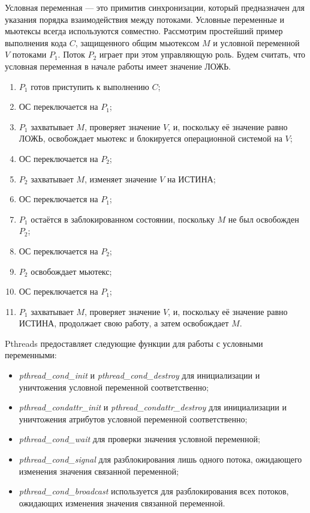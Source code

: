 Условная переменная --- это примитив синхронизации,
который предназначен для указания порядка взаимодействия между потоками.
Условные переменные и мьютексы всегда используются совместно.
Рассмотрим простейший пример выполнения кода \( C \),
защищенного общим мьютексом \( M \) и условной переменной \( V \)
потоками \( P_1 \). Поток \( P_2 \) играет при этом управляющую роль.
Будем считать, что условная переменная в начале работы имеет значение ЛОЖЬ.
\begin{enumerate}
\item \( P_1 \) готов приступить к выполнению \( C \);
\item ОС переключается на \( P_1 \);
\item \( P_1 \) захватывает \( M \), проверяет значение \( V \), и,
  поскольку её значение равно ЛОЖЬ, освобождает мьютекс и блокируется операционной системой
  на \( V \);
\item ОС переключается на \( P_2 \);
\item \( P_2 \) захватывает \( M \), изменяет значение \( V \) на ИСТИНА;
\item ОС переключается на \( P_1 \);
\item \( P_1 \) остаётся в заблокированном состоянии, поскольку \( M \) не был освобожден \( P_2 \);
\item ОС переключается на \( P_2 \);
\item \( P_2 \) освобождает мьютекс;
\item ОС переключается на \( P_1 \);
\item \( P_1 \) захватывает \( M \), проверяет значение \( V \), и,
  поскольку её значение равно ИСТИНА, продолжает свою работу, а затем освобождает \( M \).
\end{enumerate}

Pthreads предоставляет следующие функции для работы с условными переменными:
\begin{itemize}
\item \textit{pthread\_cond\_init} и \textit{pthread\_cond\_destroy}
  для инициализации и уничтожения условной переменной соответственно;
\item \textit{pthread\_condattr\_init} и \textit{pthread\_condattr\_destroy}
  для инициализации и уничтожения атрибутов условной переменной соответственно;
\item \textit{pthread\_cond\_wait} для проверки значения условной переменной;
\item \textit{pthread\_cond\_signal} для разблокирования лишь одного потока,
  ожидающего изменения значения связанной переменной;
\item \textit{pthread\_cond\_broadcast} используется для разблокирования всех потоков,
  ожидающих изменения значения связанной переменной.
\end{itemize}

